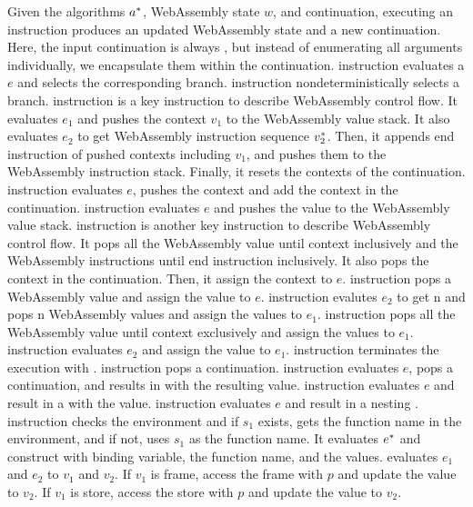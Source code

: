 Given the algorithms $a^*$, WebAssembly state $w$, and continuation,
executing an instruction produces an updated WebAssembly state and a new
continuation.
Here, the input continuation is always \algo{}, but instead of enumerating all
arguments individually, we encapsulate them within the \algo{} continuation.
\ifi{} instruction evaluates a $e$ and selects the corresponding branch.
\eitheri{} instruction nondeterministically selects a branch.
\enteri{} instruction is a key instruction to describe WebAssembly control flow.
It evaluates $e_1$ and pushes the context $v_1$ to the WebAssembly value stack.
It also evaluates $e_2$ to get WebAssembly instruction sequence $v_2^*$.
Then, it appends end instruction of pushed contexts including $v_1$, and pushes
them to the WebAssembly instruction stack.
Finally, it resets the contexts of the continuation.
\pushctxi{} instruction evaluates $e$, pushes the context and add the context
in the continuation.
\pushi{} instruction evaluates $e$ and pushes the value to the WebAssembly
value stack.
\popctxi{} instruction is another key instruction to describe WebAssembly
control flow.
It pops all the WebAssembly value until context inclusively and the WebAssembly
instructions until end instruction inclusively.
It also pops the context in the continuation.
Then, it assign the context to $e$.
\popi{} instruction pops a WebAssembly value and assign the value to $e$.
\popn{} instruction evalutes $e_2$ to get n and pops n WebAssembly values and
assign the values to $e_1$.
\popalli{} instruction pops all the WebAssembly value until context exclusively
and assign the values to $e_1$.
 instruction evaluates $e_2$ and assign the value to $e_1$.
\trapi{} instruction terminates the execution with \trapv{}.
\returnreli{} instruction pops a continuation.
\returnfunci{} instruction evaluates $e$, pops a continuation, and results in
\ret{} with the resulting value.
\executei{} instruction evaluates $e$ and result in a \exe{} with the value.
\executeseqi{} instruction evaluates $e$ and result in a nesting \exe{}.
\calli{} instruction checks the environment and if $s_1$ exists, gets the
function name in the environment, and if not, uses $s_1$ as the function name.
It evaluates $e^*$ and construct \call{} with binding variable, the function
name, and the values.
\replacei{} evaluates $e_1$ and $e_2$ to $v_1$ and $v_2$.
If $v_1$ is frame, access the frame with $p$ and update the value to $v_2$.
If $v_1$ is store, access the store with $p$ and update the value to $v_2$.





